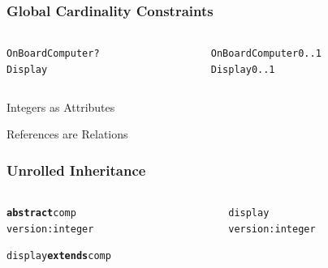 \documentclass[table,15pt,t]{beamer}
\newcounter{i}
\begin{document}
\begin{frame}[Fragile]
  \frametitle{Global Cardinality Constraints}
  \begin{columns}
    \begin{column}{0.5\textwidth}
      \begin{alltt}
        \begin{small}
\textsf{OnBoardComputer} ?
  \textsf{Display}
        \end{small}
      \end{alltt}
    \end{column}
\pause
    \begin{column}{0.5\textwidth}
      \begin{alltt}
        \begin{small}
\textsf{OnBoardComputer} 0..1
  \textsf{Display} 0..1
        \end{small}
      \end{alltt}
    \end{column}
  \end{columns}

\end{frame}

\begin{frame}{Integers as Attributes} %

\end{frame}

\begin{frame}{References are Relations} %

\end{frame}

\begin{frame}[fragile]
  \frametitle{Unrolled Inheritance}
  \begin{columns}
    \begin{column}{0.5\textwidth}
      \begin{alltt}
        \begin{small}
\textbf{abstract} \textsf{comp}
  \textsf{version} : \textsf{integer}

\textsf{display} \textbf{extends} \textsf{comp}
        \end{small}
      \end{alltt}
    \end{column}
\pause
    \begin{column}{0.5\textwidth}
      \begin{alltt}
        \begin{small}
\textsf{display}
  \textsf{version} : \textsf{integer}
        \end{small}
      \end{alltt}
    \end{column}
  \end{columns}
\end{frame}
\end{document}
